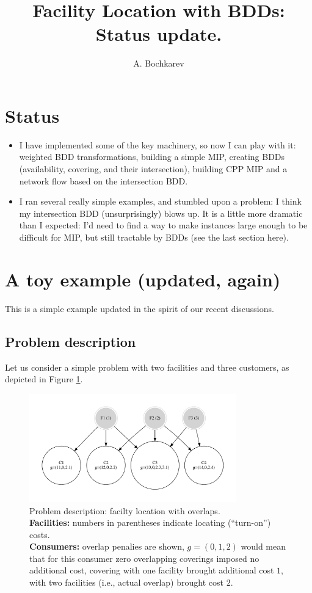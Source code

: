 \documentclass[11pt]{article}
\author{A. Bochkarev}
\date{}
\title{Facility Location with BDDs: Status update.}
\begin{document}
\maketitle

\section{Status}
\label{sec:org1999b84}
\begin{itemize}
\item I have implemented some of the key machinery, so now I can play with it:
weighted BDD transformations, building a simple MIP, creating BDDs
(availability, covering, and their intersection), building CPP MIP and a
network flow based on the intersection BDD.
\item I ran several really simple examples, and stumbled upon a problem: I think
my intersection BDD (unsurprisingly) blows up. It is a little more dramatic
than I expected: I'd need to find a way to make instances large enough
to be difficult for MIP, but still tractable by BDDs (see the last section
here).
\end{itemize}

\section{A toy example (updated, again)}
\label{sec:org0063178}
This is a simple example updated in the spirit of our recent discussions.
\subsection{Problem description}
\label{sec:org94cda4c}
Let us consider a simple problem with two facilities and three customers, as
depicted in Figure \ref{fig:problem}.

\begin{figure}[h!]
\center
\includegraphics[width=0.8\textwidth]{./problem_dia.gv.pdf}
\caption{Problem description: facilty location with overlaps. \\
\textbf{Facilities:} numbers in parentheses indicate locating (``turn-on'') costs.\\
\textbf{Consumers:} overlap penalies are shown, $g=(0,1,2)$ would mean that for this consumer zero
overlapping coverings imposed no additional cost, covering with one facility brought additional cost $1$,
with two facilities (i.e., actual overlap) brought cost $2$.}
\label{fig:problem}
\end{figure}
\end{document}
